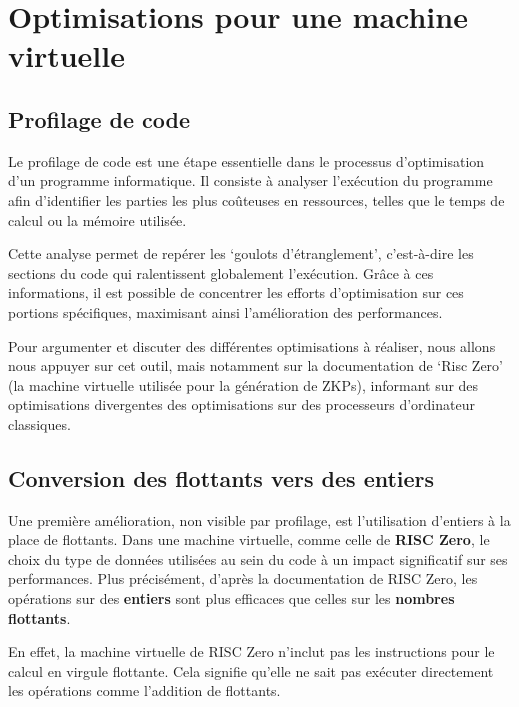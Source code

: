 \documentclass[12pt]{report}
\begin{document}
\section{Optimisations pour une machine virtuelle}

\subsection{Profilage de code}

Le profilage de code est une étape essentielle dans le processus 
d'optimisation d'un programme informatique. Il consiste à analyser 
l'exécution du programme afin d'identifier les parties les plus 
coûteuses en ressources, telles que le temps de calcul ou la 
mémoire utilisée.

\medskip

Cette analyse permet de repérer les `goulots d'étranglement', 
c'est-à-dire les sections du code qui ralentissent 
globalement l'exécution. Grâce à ces informations, il 
est possible de concentrer les efforts d'optimisation sur 
ces portions spécifiques, maximisant ainsi l'amélioration 
des performances.

\medskip

Pour argumenter et discuter des différentes optimisations à réaliser,
nous allons nous appuyer sur cet outil, mais notamment sur la documentation
de `Risc Zero' (la machine virtuelle utilisée pour la génération de ZKPs), informant
sur des optimisations divergentes des optimisations sur des processeurs d'ordinateur classiques.

\subsection{Conversion des flottants vers des entiers}

Une première amélioration, non visible par profilage, est l'utilisation
d'entiers à la place de flottants. Dans une machine virtuelle, comme celle de 
\textbf{RISC Zero}, le choix du type de données utilisées au sein
du code à un impact significatif sur ses performances. Plus 
précisément, d'après la documentation de RISC Zero, les opérations 
sur des \textbf{entiers} sont plus efficaces que celles sur les \textbf{nombres flottants}. 

En effet, la machine virtuelle de RISC Zero n'inclut pas les
instructions pour le calcul en virgule flottante. Cela signifie
qu'elle ne sait pas exécuter directement les opérations
comme l'addition de flottants.
\end{document}
